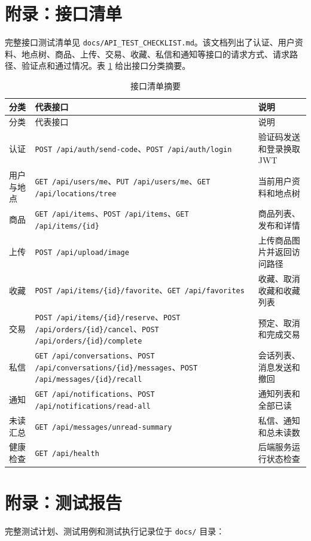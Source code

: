 ﻿\documentclass[UTF8,a4paper,12pt]{ctexart}
\begin{document}
\section{附录：接口清单}
完整接口测试清单见 \texttt{docs/API\_TEST\_CHECKLIST.md}。该文档列出了认证、用户资料、地点树、商品、上传、交易、收藏、私信和通知等接口的请求方式、请求路径、验证点和通过情况。表 \ref{tab:appendix-api-summary} 给出接口分类摘要。

\begin{longtable}{p{3.2cm}p{4cm}p{6cm}}
  \caption{接口清单摘要}\label{tab:appendix-api-summary} \\
  \toprule
  分类 & 代表接口 & 说明 \\
  \midrule
  \endfirsthead
  \toprule
  分类 & 代表接口 & 说明 \\
  \midrule
  \endhead
  认证 & \texttt{POST /api/auth/send-code}、\texttt{POST /api/auth/login} & 验证码发送和登录换取 JWT \\
  用户与地点 & \texttt{GET /api/users/me}、\texttt{PUT /api/users/me}、\texttt{GET /api/locations/tree} & 当前用户资料和地点树 \\
  商品 & \texttt{GET /api/items}、\texttt{POST /api/items}、\texttt{GET /api/items/\{id\}} & 商品列表、发布和详情 \\
  上传 & \texttt{POST /api/upload/image} & 上传商品图片并返回访问路径 \\
  收藏 & \texttt{POST /api/items/\{id\}/favorite}、\texttt{GET /api/favorites} & 收藏、取消收藏和收藏列表 \\
  交易 & \texttt{POST /api/items/\{id\}/reserve}、\texttt{POST /api/orders/\{id\}/cancel}、\texttt{POST /api/orders/\{id\}/complete} & 预定、取消和完成交易 \\
  私信 & \texttt{GET /api/conversations}、\texttt{POST /api/conversations/\{id\}/messages}、\texttt{POST /api/messages/\{id\}/recall} & 会话列表、消息发送和撤回 \\
  通知 & \texttt{GET /api/notifications}、\texttt{POST /api/notifications/read-all} & 通知列表和全部已读 \\
  未读汇总 & \texttt{GET /api/messages/unread-summary} & 私信、通知和总未读数 \\
  健康检查 & \texttt{GET /api/health} & 后端服务运行状态检查 \\
  \bottomrule
\end{longtable}

\section{附录：测试报告}
完整测试计划、测试用例和测试执行记录位于 \texttt{docs/} 目录：
\end{document}
